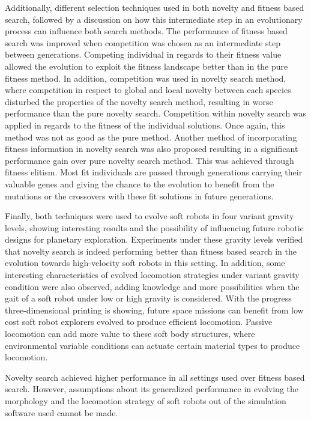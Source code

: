 Additionally, different selection techniques used in both novelty and fitness based search, followed by a discussion on how this intermediate step in an evolutionary process can influence both search methods. The performance of fitness based search was improved when competition was chosen as an intermediate step between generations. Competing individual in regards to their fitness value allowed the evolution to exploit the fitness landscape better than in the pure fitness method. In addition, competition was used in novelty search method, where competition in respect to global and local novelty between each species disturbed the properties of the novelty search method, resulting in worse performance than the pure novelty search. Competition within novelty search was applied in regards to the fitness of the individual solutions. Once again, this method was not as good as the pure method. Another method of incorporating fitness information in novelty search was also proposed resulting in a significant performance gain over pure novelty search method. This was achieved through fitness elitism. Most fit individuals are passed through generations carrying their valuable genes and giving the chance to the evolution to benefit from the mutations or the crossovers with these fit solutions in future generations. 

Finally, both techniques were used to evolve soft robots in four variant gravity levels, showing interesting results and the possibility of influencing future robotic designs for planetary exploration. Experiments under these gravity levels verified that novelty search is indeed performing better than fitness based search in the evolution towards high-velocity soft robots in this setting. In addition, some interesting characteristics of evolved locomotion strategies under variant gravity condition were also observed, adding knowledge and more possibilities when the gait of a soft robot under low or high gravity is considered. With the progress three-dimensional printing is showing, future space missions can benefit from low cost soft robot explorers evolved to produce efficient locomotion. Passive locomotion can add more value to these soft body structures, where environmental variable conditions can actuate certain material types to produce locomotion.

Novelty search achieved higher performance in all settings used over fitness based search. However, assumptions about its generalized performance in evolving the morphology and the locomotion strategy of soft robots out of the simulation software used cannot be made. 

